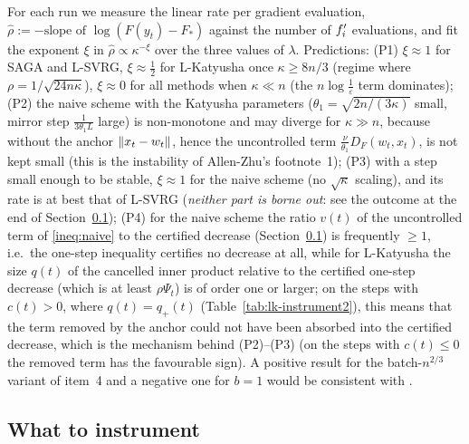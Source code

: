 For each run we measure the linear rate per gradient evaluation, $\hat\rho:=-\text{slope of }\log(F(y_t)-F_\ast)$ against the number of $f'_i$ evaluations, and fit the exponent $\xi$ in $\hat\rho\propto\kappa^{-\xi}$ over the three values of $\lambda$. Predictions: (P1) $\xi\approx1$ for SAGA and L-SVRG, $\xi\approx\frac12$ for L-Katyusha once $\kappa\ge8n/3$ (regime where $\rho=1/\sqrt{24n\kappa}$), $\xi\approx0$ for all methods when $\kappa\ll n$ (the $n\log\frac1\varepsilon$ term dominates); (P2) the naive scheme with the Katyusha parameters ($\theta_1=\sqrt{2n/(3\kappa)}$ small, mirror step $\frac1{3\theta_1L}$ large) is non-monotone and may diverge for $\kappa\gg n$, because without the anchor $\left\|x_t-w_t\right\|$, hence the uncontrolled term $\frac\nu{\theta_1}D_F(w_t,x_t)$, is not kept small (this is the instability of Allen-Zhu's footnote~1); (P3) with a step small enough to be stable, $\xi\approx1$ for the naive scheme (no $\sqrt\kappa$ scaling), and its rate is at best that of L-SVRG (\emph{neither part is borne out}: see the outcome at the end of Section~\ref{sec:lk-instrument}); (P4) for the naive scheme the ratio $v(t)$ of the uncontrolled term of \eqref{ineq:naive} to the certified decrease (Section~\ref{sec:lk-instrument}) is frequently $\ge1$, i.e.\ the one-step inequality certifies no decrease at all, while for L-Katyusha the size $q(t)$ of the cancelled inner product relative to the certified one-step decrease (which is at least $\rho\Psi_t$) is of order one or larger; on the steps with $c(t)>0$, where $q(t)=q_+(t)$ (Table~\ref{tab:lk-instrument2}), this means that the term removed by the anchor could not have been absorbed into the certified decrease, which is the mechanism behind (P2)--(P3) (on the steps with $c(t)\le0$ the removed term has the favourable sign). A positive result for the batch-$n^{2/3}$ variant of item~4 and a negative one for $b=1$ would be consistent with \cite{driggs2022accelerating,nitanda2014stochastic}.

\subsection{What to instrument}
\label{sec:lk-instrument}

